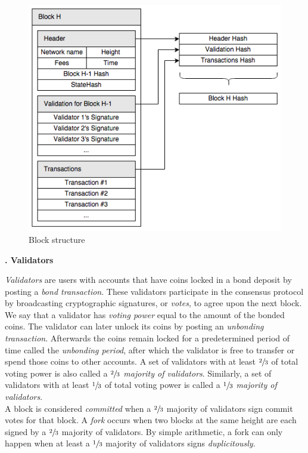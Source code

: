 \documentclass[letter,11pt]{article}
\newcounter{myseccnt}     %
\newcounter{mysubseccnt}  %
\newcommand{\mysection}[1]
{\vspace{9mm}\noindent\fontsize{13pt}{15pt}\setcounter{mysubseccnt}{0}
\stepcounter{myseccnt}\textbf{\arabic{myseccnt}. #1}\normalsize\vspace{5mm}}
\begin{document}
\begin{figure}[H]
 \centering
 \includegraphics[scale=0.5]{figures/block.png}
 \caption{Block structure}
 \label{fig:block}
\end{figure}


\mysection{Validators}

\textit{Validators} are users with accounts that have coins locked in a bond deposit by posting a \textit{bond transaction}.  These validators participate in the consensus protocol by broadcasting cryptographic signatures, or \textit{votes}, to agree upon the next block.  We say that a validator has \textit{voting power} equal to the amount of the bonded coins.  The validator can later unlock its coins by posting an \textit{unbonding transaction}.  Afterwards the coins remain locked for a predetermined period of time called the \textit{unbonding period}, after which the validator is free to transfer or spend those coins to other accounts.  A set of validators with at least $\sfrac{2}{3}$ of total voting power is also called a \textit{$\sfrac{2}{3}$ majority of validators}.  Similarly, a set of validators with at least $\sfrac{1}{3}$ of total voting power is called a \textit{$\sfrac{1}{3}$ majority of validators}.\\

A block is considered \textit{committed} when a $\sfrac{2}{3}$ majority of validators sign commit votes for that block.  A \textit{fork} occurs when two blocks at the same height are each signed by a $\sfrac{2}{3}$ majority of validators.  By simple arithmetic, a fork can only happen when at least a $\sfrac{1}{3}$ majority of validators signs \textit{duplicitously}.\\
\end{document}
